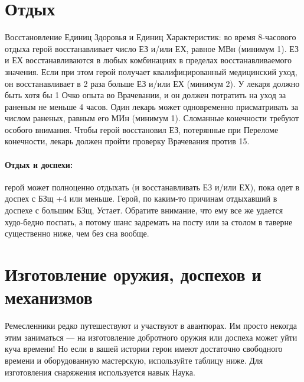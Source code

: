 \section{Отдых}
Восстановление Единиц Здоровья и Единиц Характеристик: во время 8-часового отдыха герой восстанавливает число ЕЗ и/или ЕХ, равное МВн (минимум 1). ЕЗ и ЕХ восстанавливаются в любых комбинациях в пределах восстанавливаемого значения. Если при этом герой получает квалифицированный медицинский уход, он восстанавливает в 2 раза больше ЕЗ и/или ЕХ (минимум 2). У лекаря должно быть хотя бы 1 Очко опыта во Врачевании, и он должен потратить на уход за раненым не меньше 4 часов. Один лекарь может одновременно присматривать за числом раненых, равным его МИн (минимум 1).
Сломанные конечности требуют особого внимания. Чтобы герой восстановил ЕЗ, потерянные при Переломе конечности, лекарь должен пройти проверку Врачевания против 15.
\paragraph{Отдых и доспехи:} герой может полноценно отдыхать (и восстанавливать ЕЗ и/или ЕХ), пока одет в доспех с БЗщ +4 или меньше. Герой, по каким-то причинам отдыхавший в доспехе с большим БЗщ, Устает. Обратите внимание, что ему все же удается худо-бедно поспать, а потому шанс задремать на посту или за столом в таверне существенно ниже, чем без сна вообще.
\section{Изготовление оружия, доспехов и механизмов}
Ремесленники редко путешествуют и участвуют в авантюрах. Им просто некогда этим заниматься — на изготовление добротного оружия или доспеха может уйти куча времени! Но если в вашей истории герои имеют достаточно свободного времени и оборудованную мастерскую, используйте таблицу ниже. Для изготовления снаряжения используется навык Наука.
